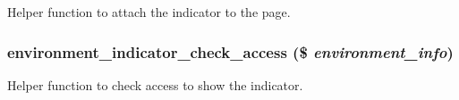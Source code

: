 \label{environment__indicator_8module_ad423047f81edbbe6b20b7a45473f8d02}
Helper function to attach the indicator to the page. \hypertarget{environment__indicator_8module_aa0667e307732cf17ae0c7a4065769d6b}{
\subsubsection[{environment\_\-indicator\_\-check\_\-access}]{\setlength{\rightskip}{0pt plus 5cm}environment\_\-indicator\_\-check\_\-access (\$ {\em environment\_\-info})}}
\label{environment__indicator_8module_aa0667e307732cf17ae0c7a4065769d6b}
Helper function to check access to show the indicator.


